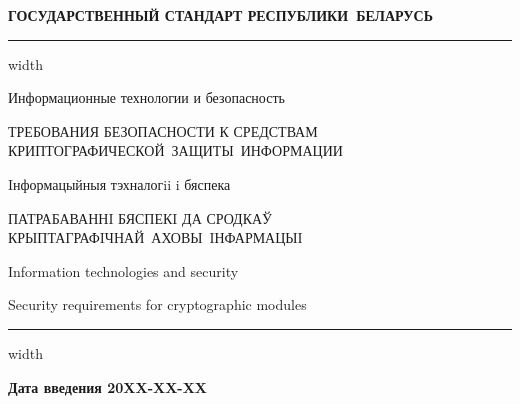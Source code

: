 \newpage
\setcounter{page}{1}
\pagestyle{headings}

\begin{center}
{\bfseries
ГОСУДАРСТВЕННЫЙ СТАНДАРТ РЕСПУБЛИКИ~БЕЛАРУСЬ
\vskip 2pt
\hrule width\textwidth

\vskip 9pt

Информационные технологии и безопасность

ТРЕБОВАНИЯ БЕЗОПАСНОСТИ К СРЕДСТВАМ КРИПТОГРАФИЧЕСКОЙ~ЗАЩИТЫ~ИНФОРМАЦИИ

\vskip 9pt

Iнформацыйныя тэхналогii i бяспека

ПАТРАБАВАННI БЯСПЕКI ДА СРОДКАЎ КРЫПТАГРАФIЧНАЙ~АХОВЫ~IНФАРМАЦЫI
}

\vskip 9pt

Information technologies and security

Security requirements for cryptographic modules

\vskip 4pt                
\hrule width \textwidth
\end{center}

\mbox{}\hfill{\bfseries Дата введения 20XX-XX-XX}


